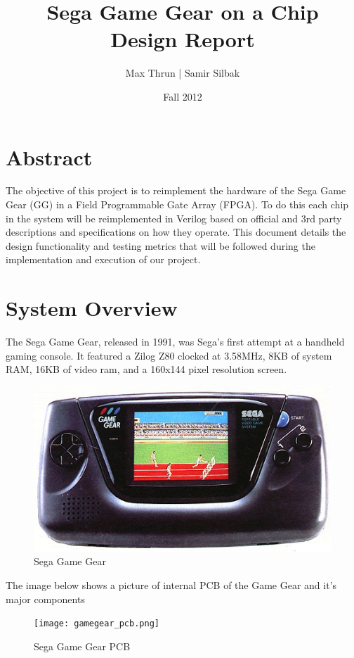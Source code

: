 \documentclass{article}
\title{
    \vspace{2in}
    \textbf{Sega Game Gear on a Chip}\\
    Design Report
    \vspace{3in}
}
\author{ Max Thrun | Samir Silbak}
\date{Fall 2012}
\begin{document}
\maketitle

\newpage
\tableofcontents
\newpage

\section{Abstract}
The objective of this project is to reimplement the hardware of the
Sega Game Gear (GG) in a Field Programmable Gate Array (FPGA). To do this
each chip in the system will be reimplemented in Verilog based on
official and 3rd party descriptions and specifications on how they operate. This
document details the design functionality and testing metrics that
will be followed during the implementation and execution of our project.

\section{System Overview}
The Sega Game Gear, released in 1991, was Sega's first attempt at a handheld
gaming console. It featured a Zilog Z80 clocked at 3.58MHz, 8KB of system RAM,
16KB of video ram, and a 160x144 pixel resolution screen.

\begin{figure}[!htbp]
\centering
\includegraphics[scale=0.4]{gamegear.png}
\caption{Sega Game Gear \protect\cite{gg}}
\label{fig:gg}
\end{figure}

The image below shows a picture of internal PCB of the Game Gear and
it's major components

\begin{figure}[!htbp]
\centering
\texttt{[image: gamegear\_pcb.png]}
\caption{Sega Game Gear PCB}
\label{fig:gg}
\end{figure}
\end{document}
